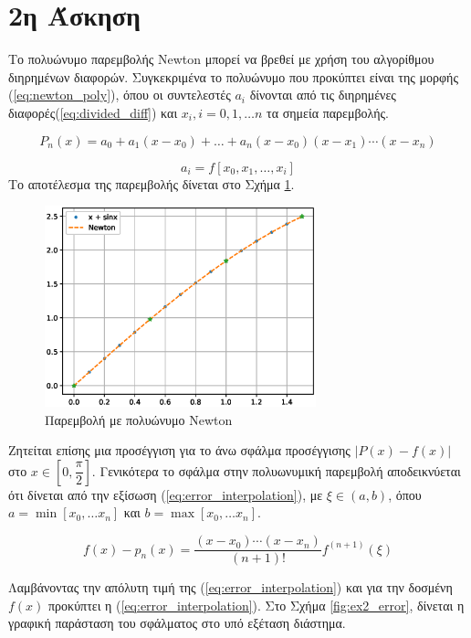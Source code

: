 \documentclass[assignment3.tex]{subfiles}
\begin{document}
\section*{2η Άσκηση}
Το πολυώνυμο παρεμβολής \textlatin{Newton} μπορεί να βρεθεί με χρήση του αλγορίθμου διηρημένων διαφορών. Συγκεκριμένα το πολυώνυμο που προκύπτει είναι της μορφής (\ref{eq:newton_poly}), όπου οι συντελεστές $a_i$ δίνονται από τις διηρημένες διαφορές(\ref{eq:divided_diff}) και $x_i,i=0,1,\dots n$ τα σημεία παρεμβολής. 

\begin{equation}
P_n(x) = a_0 + a_1(x-x_0) + \dots + a_n(x-x_0)(x-x_1)\cdots (x-x_n)
\label{eq:newton_poly}
\end{equation}

\begin{equation}
a_i = f[x_0, x_1, \dots, x_i]
\label{eq:divided_diff}
\end{equation}
Το αποτέλεσμα της παρεμβολής δίνεται στο Σχήμα \ref{fig:ex2}.
\begin{figure}[hp]
	\includegraphics[width=0.7\textwidth]{ex2.eps}
	\centering
	\caption{Παρεμβολή με πολυώνυμο \textlatin{Newton}}
	\label{fig:ex2}
\end{figure}

Zητείται επίσης μια προσέγγιση για το άνω σφάλμα προσέγγισης $|P(x)-f(x)|$ στο $x\in[0,\dfrac{\pi}{2}]$. Γενικότερα το σφάλμα στην πολυωνυμική παρεμβολή αποδεικνύεται ότι δίνεται από την εξίσωση (\ref{eq:error_interpolation}), με $\xi\in (a, b)$, όπου $a=\min[x_0, \dots x_n]$ και $b=\max[x_0, \dots x_n]$.

\begin{equation}
f(x)-p_n(x)=\frac{(x-x_0)\cdots(x-x_n)}{(n+1)!}f^{(n+1)}(\xi)
\label{eq:error_interpolation}
\end{equation}

Λαμβάνοντας την απόλυτη τιμή της (\ref*{eq:error_interpolation}) και για την δοσμένη $f(x)$ προκύπτει η (\ref{eq:error_interpolation}). Στο Σχήμα \ref{fig:ex2_error}, δίνεται η γραφική παράσταση του σφάλματος στο υπό εξέταση διάστημα.
\end{document}

